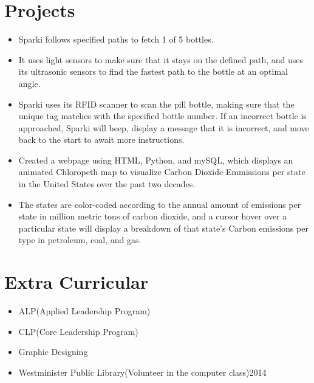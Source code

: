 \documentclass[10pt,a4paper,roman]{moderncv} %
\begin{document}
\section {Projects}
\begin{itemize}
\item{Sparki follows specified paths to fetch 1 of 5 bottles.} 
\item{It uses light sensors to make sure that it stays on the defined path, and uses its ultrasonic sensors to find the fastest path to the bottle at an optimal angle.} 
\item{Sparki uses its RFID scanner to scan the pill bottle, making sure that the unique tag  matches with the specified bottle number. If an incorrect bottle is approached, Sparki will beep, display a message that it is incorrect, and move back to the start to await more instructions.}
\end{itemize}

\hfill \break
{}
\begin{itemize}
\item{ Created a webpage using HTML, Python, and mySQL, which displays an animated Chloropeth map to visualize Carbon Dioxide Emmissions per state in the United States over the past two decades.}
\item{The states are color-coded according to the annual amount of emissions per state in million metric tons of carbon dioxide, and a cursor hover over a particular state will display a breakdown of that state's Carbon emissions per type in petroleum, coal, and gas.}
\end{itemize}

\section{Extra Curricular}
\begin{itemize}
\item{}{ALP(Applied Leadership Program)}
\item{}{CLP(Core Leadership Program)}
\item{}{Graphic Designing}
\item{}{Westminister Public Library(Volunteer in the computer class){2014}}
\end{itemize}
\end{document}
